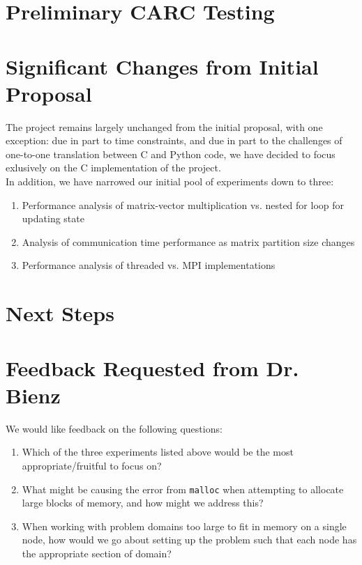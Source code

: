 \documentclass[12pt]{article}
\begin{document}
\section{Preliminary CARC Testing}

\section{Significant Changes from Initial Proposal}

The project remains largely unchanged from the initial proposal, with one exception: due in part to time constraints, and due in part to the challenges of one-to-one translation between C and Python code, we have decided to focus exlusively on the C implementation of the project. \\

In addition, we have narrowed our initial pool of experiments down to three:

\begin{enumerate}
    \item Performance analysis of matrix-vector multiplication vs. nested for loop for updating state
    \item Analysis of communication time performance as matrix partition size changes
    \item Performance analysis of threaded vs. MPI implementations
\end{enumerate}

\section{Next Steps}

\section{Feedback Requested from Dr. Bienz}

We would like feedback on the following questions:

\begin{enumerate}
    \item Which of the three experiments listed above would be the most appropriate/fruitful to focus on?
    \item What might be causing the error from \texttt{malloc} when attempting to allocate large blocks of memory, and how might we address this?
    \item When working with problem domains too large to fit in memory on a single node, how would we go about setting up the problem such that each node has the appropriate section of domain?
\end{enumerate}

\printbibliography[
heading=bibintoc,
title={References}
]
\end{document}
